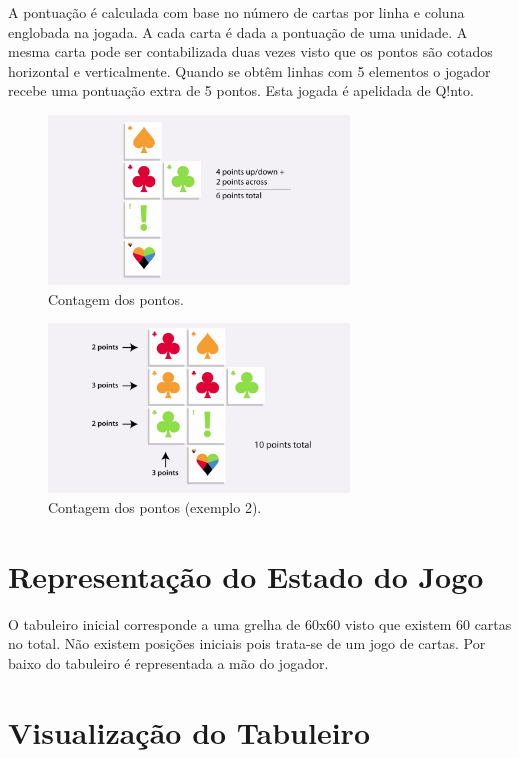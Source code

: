 \documentclass[a4paper]{article}
\begin{document}
A pontuação é calculada com base no número de cartas por linha e coluna englobada na jogada. A cada carta é dada a pontuação de uma unidade. A mesma carta pode ser contabilizada duas vezes visto que os pontos são cotados horizontal e verticalmente. Quando se obtêm linhas com 5 elementos o jogador recebe uma pontuação extra de 5 pontos. Esta jogada é apelidada de Q!nto.

\begin{figure}[h]
\centering
\includegraphics[width=80mm]{points.jpg}
\caption{Contagem dos pontos. \label{points1}}
\end{figure}

\begin{figure}[hb!]
\centering
\includegraphics[width=80mm]{points2.jpg}
\caption{Contagem dos pontos (exemplo 2). \label{points2}}
\end{figure}

\section{Representação do Estado do Jogo}

O tabuleiro inicial corresponde a uma grelha de 60x60 visto que existem 60 cartas no total. Não existem posições iniciais pois trata-se de um jogo de cartas. Por baixo do tabuleiro é representada a mão do jogador. 

\section{Visualização do Tabuleiro}
\end{document}
